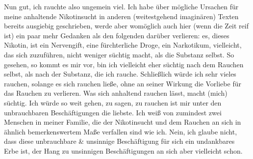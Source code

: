 \documentclass{scrbook}
\begin{document}
Nun gut, ich rauchte also ungemein viel. Ich habe über mögliche Ursachen für
meine anhaltende Nikotinsucht in anderen (weitestgehend imaginären) Texten
bereits ausgiebig geschrieben, werde aber womöglich auch hier (wenn die Zeit
reif ist) ein paar mehr Gedanken als den folgenden darüber verlieren: es,
dieses Nikotin, ist ein Nervengift, eine fürchterliche Droge, ein Narkotikum,
vielleicht, das sich zuzuführen, nicht weniger süchtig macht, als die
Substanz selbst. So gesehen, so kommt es mir vor, bin ich vielleicht eher
süchtig nach dem Rauchen selbst, als nach der Substanz, die ich rauche.
Schließlich würde ich sehr vieles rauchen, solange es sich rauchen ließe,
ohne an seiner Wirkung die Vorliebe für das Rauchen zu verlieren. Was sich
anhaltend rauchen lässt, macht (mich) süchtig. Ich würde so weit gehen, zu
sagen, zu rauchen ist mir unter den unbrauchbaren Beschäftigungen die
liebste. Ich weiß von zumindest zwei Menschen in meiner Familie, die der
Nikotinsucht und dem Rauchen an sich in ähnlich bemerkenswertem Maße
verfallen sind wie ich. Nein, ich glaube nicht, dass diese unbrauchbare \&
unsinnige Beschäftigung für sich ein undankbares Erbe ist, der Hang zu
unsinnigen Beschäftigungen an sich aber vielleicht schon.
\end{document}
